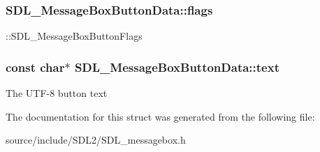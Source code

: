 \subsubsection[{flags}]{ S\+D\+L\+\_\+\+Message\+Box\+Button\+Data\+::flags}\label{struct_s_d_l___message_box_button_data_a426c8b5da0e718242c7840706d95de0b}
\+::\+S\+D\+L\+\_\+\+Message\+Box\+Button\+Flags \hypertarget{struct_s_d_l___message_box_button_data_af35f3062f0577159284c8828caaf08e4}{}
\subsubsection[{text}]{\setlength{\rightskip}{0pt plus 5cm}const char$\ast$ S\+D\+L\+\_\+\+Message\+Box\+Button\+Data\+::text}\label{struct_s_d_l___message_box_button_data_af35f3062f0577159284c8828caaf08e4}
The U\+T\+F-\/8 button text 

The documentation for this struct was generated from the following file\+:\begin{DoxyCompactItemize}
\item 
source/include/\+S\+D\+L2/S\+D\+L\+\_\+messagebox.\+h\end{DoxyCompactItemize}
